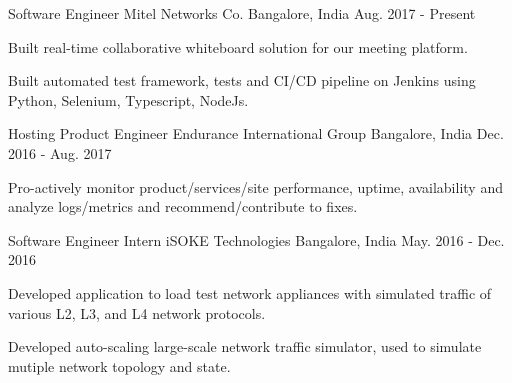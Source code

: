 

\begin{cventries}

  \cventry
    {Software Engineer} %
    {Mitel Networks Co.} %
    {Bangalore, India} %
    {Aug. 2017 - Present} %
    {
      \begin{cvitems} %
        \item {Built real-time collaborative whiteboard solution for our meeting platform.}
        \item {Built automated test framework, tests and CI/CD pipeline on Jenkins using Python, Selenium, Typescript, NodeJs.}
      \end{cvitems}
    }

  \cventry
    {Hosting Product Engineer} %
    {Endurance International Group} %
    {Bangalore, India} %
    {Dec. 2016 - Aug. 2017} %
    {
      \begin{cvitems} %
        \item {Pro-actively monitor product/services/site performance, uptime, availability and analyze logs/metrics and recommend/contribute to fixes.}
      \end{cvitems}
    }

  \cventry
    {Software Engineer Intern} %
    {iSOKE Technologies } %
    {Bangalore, India} %
    {May. 2016 - Dec. 2016} %
    {
      \begin{cvitems} %
        \item {Developed application to load test network appliances with simulated traffic of various L2, L3, and L4 network protocols.}
        \item {Developed auto-scaling large-scale network traffic simulator, used to simulate mutiple network topology and state.}
      \end{cvitems}
    }
\end{cventries}
